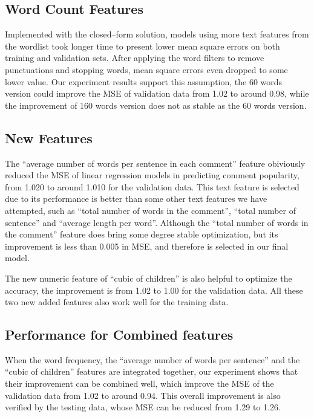 \documentclass[letterpaper, 11pt]{article}
\begin{document}
\subsection*{Word Count Features}

Implemented with the closed\---form solution, models using more text features from the wordlist took longer time to present lower mean square errors on both training and validation sets. After applying the word filters to remove punctuations and stopping words, mean square errors even dropped to some lower value. Our experiment results support this assumption, the 60 words version could improve the MSE of validation data from 1.02 to around 0.98, while the improvement of 160 words version does not as stable as the 60 words version.

\subsection*{New Features}

The ``average number of words per sentence in each comment'' feature obiviously reduced the MSE of linear regression models in predicting comment popularity, from 1.020 to around 1.010 for the validation data. This text feature is selected due to its performance is better than some other text features we have attempted, such as ``total number of words in the comment'', ``total number of sentence'' and ``average length per word''. Although the ``total number of words in the comment'' feature does bring some degree stable optimization, but its improvement is less than 0.005 in MSE, and therefore is selected in our final model.

The new numeric feature of ``cubic of children'' is also helpful to optimize the accuracy, the improvement is from 1.02 to 1.00 for the validation data. All these two new added features also work well for the training data.

\subsection*{Performance for Combined features}

When the word frequency, the ``average number of words per sentence'' and the ``cubic of children'' features are integrated together, our experiment shows that their improvement can be combined well, which improve the MSE of the validation data from 1.02 to around 0.94. This overall improvement is also verified by the testing data, whose MSE can be reduced from 1.29 to 1.26.
\end{document}
